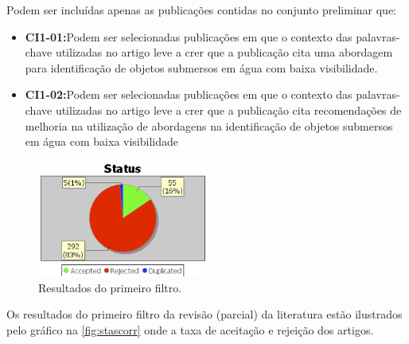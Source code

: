 Podem ser incluídas apenas as publicações contidas no conjunto preliminar que:
\begin{itemize}
	\item \textbf{CI1-01:}Podem ser selecionadas publicações em que o contexto das palavras-chave utilizadas no artigo leve a crer que a publicação cita uma abordagem para identificação de objetos submersos em água com baixa visibilidade.
	\item \textbf{CI1-02:}Podem ser selecionadas publicações em que o contexto das palavras-chave utilizadas no artigo leve a crer que a publicação cita recomendações de melhoria na utilização de abordagens na identificação de objetos submersos em água com baixa visibilidade
\end{itemize}

\begin{figure}[ht]
	\caption{\label{fig:stascorr} Resultados do primeiro filtro.}
	\begin{center}
	    \includegraphics[width=0.5\textwidth]{resources/analisecorre}
	\end{center}
\end{figure}

Os resultados do primeiro filtro da revisão (parcial) da literatura estão ilustrados pelo gráfico na \autoref{fig:stascorr} onde a taxa de aceitação e rejeição dos artigos.